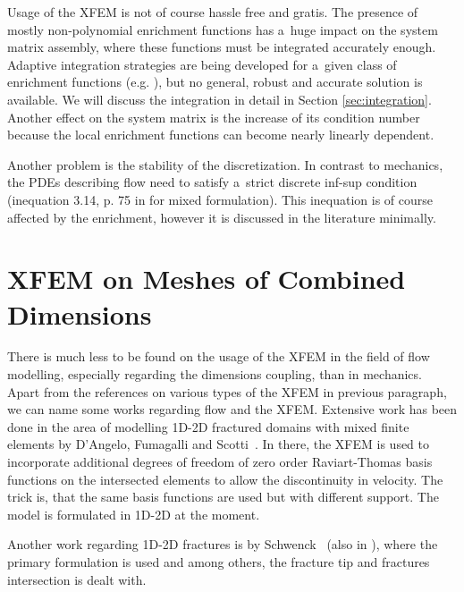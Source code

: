 \documentclass[FM,Dis]{tulthesis}
\begin{document}
Usage of the XFEM is not of course hassle free and gratis. The presence of mostly non-polynomial enrichment functions
has a~huge impact on the system matrix assembly, where these functions must be integrated accurately enough.
Adaptive integration strategies are being developed for a~given class of enrichment functions (e.g. \cite{ventura_fast_2009}), 
but no general, robust and accurate solution is available. We will discuss the integration in detail in Section \ref{sec:integration}.
Another effect on the system matrix is the increase of its condition number because the local enrichment functions can
become nearly linearly dependent. 

Another problem is the stability of the discretization. In contrast to mechanics, the PDEs describing flow
need to satisfy a~strict discrete inf-sup condition (inequation 3.14, p. 75 in \cite{brezzi_mixed_1991} for mixed formulation).
This inequation is of course affected by the enrichment, however it is discussed in the literature minimally.


\section{XFEM on Meshes of Combined Dimensions} \label{sec:soa_xfem_combined}
There is much less to be found on the usage of the XFEM in the field of flow modelling, especially regarding the dimensions coupling,
than in mechanics.
Apart from the references on various types of the XFEM in previous paragraph, we can name some works regarding flow and the XFEM.
Extensive work has been done in the area of modelling 1D-2D fractured domains with mixed finite 
elements by D'Angelo, Fumagalli and Scotti~\cite{fumagalli_numerical_2012, dangelo_mixed_2012, fumagalli_efficient_2014}. 
In there, the XFEM is used to incorporate additional degrees of freedom of zero order Raviart-Thomas basis 
functions on the intersected elements to allow the discontinuity in velocity. The trick is, that the same
basis functions are used but with different support. The model is formulated in 1D-2D at the moment.

Another work regarding 1D-2D fractures is by Schwenck~\cite{schwenck_xfem-based_2015} (also in \cite{schwenck_2015}), 
where the primary formulation is used and among others, the fracture tip and fractures intersection is dealt with.
\end{document}
